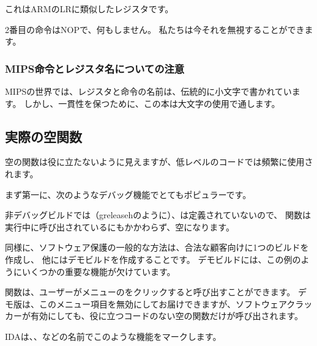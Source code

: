 これはARMの\ac{LR}に類似したレジスタです。

2番目の命令は\ac{NOP}で、何もしません。 私たちは今それを無視することができます。

\subsubsection{MIPS命令とレジスタ名についての注意}

MIPSの世界では、レジスタと命令の名前は、伝統的に小文字で書かれています。
しかし、一貫性を保つために、この本は大文字の使用で通します。

\subsection{実際の空関数}

空の関数は役に立たないように見えますが、低レベルのコードでは頻繁に使用されます。

まず第一に、次のようなデバッグ機能でとてもポピュラーです。



非デバッグビルドでは（greleasehのように）、は定義されていないので、
関数は実行中に呼び出されているにもかかわらず、空になります。

同様に、ソフトウェア保護の一般的な方法は、合法な顧客向けに1つのビルドを作成し、
他にはデモビルドを作成することです。 デモビルドには、この例のようにいくつかの重要な機能が欠けています。



関数は、ユーザーがメニューのをクリックすると呼び出すことができます。 
デモ版は、このメニュー項目を無効にしてお届けできますが、ソフトウェアクラッカーが有効にしても、役に立つコードのない空の関数だけが呼び出されます。

IDAは、、などの名前でこのような機能をマークします。
